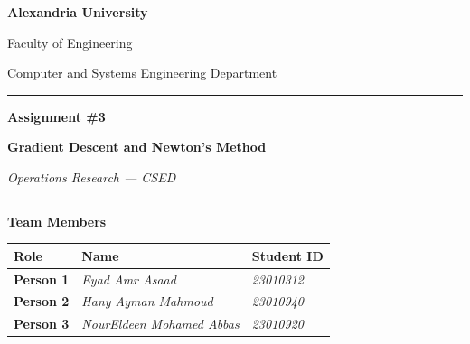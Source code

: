 \documentclass[12pt,a4paper]{article}
\begin{document}
\begin{titlepage}
    \centering
    \vspace*{1cm}

    {\Large \textbf{Alexandria University} \par}
    {\large Faculty of Engineering \par}
    {\large Computer and Systems Engineering Department \par}

    \vspace{0.5cm}
    \noindent\rule{\textwidth}{0.8pt}
    \vspace{0.3cm}

    {\LARGE \textbf{\color{alexblue} Assignment \#3} \par}
    \vspace{0.3cm}
    {\Large \textbf{Gradient Descent and Newton's Method} \par}
    {\large \textit{Operations Research — CSED} \par}

    \vspace{0.3cm}
    \noindent\rule{\textwidth}{0.8pt}
    \vspace{1cm}

    {\large \textbf{Team Members} \par}
    \vspace{0.4cm}

    \begin{tabular}{>{\bfseries}l l l}
        \toprule
        \textbf{Role} & \textbf{Name} & \textbf{Student ID} \\
        \midrule
        Person 1 & \textit{Eyad Amr Asaad} & \textit{23010312} \\
        Person 2 & \textit{Hany Ayman Mahmoud} & \textit{23010940} \\
        Person 3 & \textit{NourEldeen Mohamed Abbas} & \textit{23010920} \\
        \bottomrule
    \end{tabular}

    \vspace{1.5cm}
\end{titlepage}

\tableofcontents
\newpage

\end{document}
